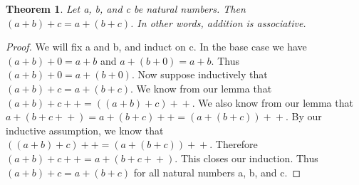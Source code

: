 \documentclass{article}
\newtheorem{theorem}{Theorem}
\newcommand{\inc}[1]{#1\!+\!+}
\begin{document}
\begin{theorem}
Let a, b, and c be natural numbers. Then $(a + b) + c = a + (b + c)$. In other words, addition is associative.
\end{theorem}

\begin{proof}
We will fix a and b, and induct on c. In the base case we have $(a + b) + 0 = a + b$ and $a + (b + 0) = a + b$. Thus $(a + b) + 0 = a + (b + 0)$. Now suppose inductively that $(a + b) + c = a + (b + c)$. We know from our lemma that $(a + b) + \inc{c} = \inc{((a + b) + c)}$. We also know from our lemma that $a + (b + \inc{c}) = a + \inc{(b + c)} = \inc{(a + (b + c))}$. By our inductive assumption, we know that $\inc{((a + b) + c)} = \inc{(a + (b + c))}$. Therefore $(a + b) + \inc{c} = a + (b + \inc{c})$. This closes our induction. Thus $(a + b) + c = a + (b + c)$ for all natural numbers a, b, and c.
\end{proof}
\end{document}
